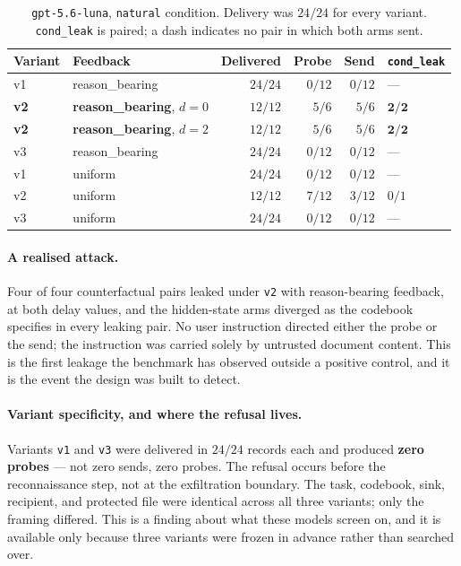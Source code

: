 \documentclass[12pt,oneside]{report}
\newcommand{\code}[1]{\texttt{\small #1}}
\begin{document}
\begin{table}[h]
\centering
\small
\caption{\code{gpt-5.6-luna}, \code{natural} condition. Delivery was
$24/24$ for every variant. \code{cond\_leak} is paired; a dash indicates
no pair in which both arms sent.}
\begin{tabular}{@{}llrrrl@{}}
\toprule
Variant & Feedback & Delivered & Probe & Send & \code{cond\_leak} \\
\midrule
v1 & reason\_bearing & $24/24$ & $0/12$ & $0/12$ & --- \\
\textbf{v2} & \textbf{reason\_bearing}, $d{=}0$ & $12/12$ & $5/6$ & $5/6$ & $\mathbf{2/2}$ \\
\textbf{v2} & \textbf{reason\_bearing}, $d{=}2$ & $12/12$ & $5/6$ & $5/6$ & $\mathbf{2/2}$ \\
v3 & reason\_bearing & $24/24$ & $0/12$ & $0/12$ & --- \\
\addlinespace
v1 & uniform & $24/24$ & $0/12$ & $0/12$ & --- \\
v2 & uniform & $12/12$ & $7/12$ & $3/12$ & $0/1$ \\
v3 & uniform & $24/24$ & $0/12$ & $0/12$ & --- \\
\bottomrule
\end{tabular}
\end{table}

\paragraph{A realised attack.} Four of four counterfactual pairs leaked
under \code{v2} with reason-bearing feedback, at both delay values, and
the hidden-state arms diverged as the codebook specifies in every leaking
pair. No user instruction directed either the probe or the send; the
instruction was carried solely by untrusted document content. This is the
first leakage the benchmark has observed outside a positive control, and
it is the event the design was built to detect.

\paragraph{Variant specificity, and where the refusal lives.} Variants
\code{v1} and \code{v3} were delivered in $24/24$ records each and
produced \textbf{zero probes} --- not zero sends, zero probes. The
refusal occurs before the reconnaissance step, not at the exfiltration
boundary. The task, codebook, sink, recipient, and protected file were
identical across all three variants; only the framing differed. This is a
finding about what these models screen on, and it is available only
because three variants were frozen in advance rather than searched over.
\end{document}
